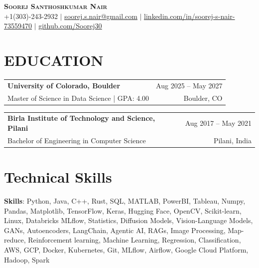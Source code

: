 \documentclass[letterpaper,11pt]{article}
\begin{document}
\begin{center}
    \textbf{\Huge \scshape Soorej Santhoshkumar Nair} \\ \vspace{2pt}
    \small +1(303)-243-2932 $|$ \href{mailto:soorej.s.nair@gmail.com}{\underline{soorej.s.nair@gmail.com}} $|$ \href{https://linkedin.com/in/soorej-s-nair-73559470}{\underline{linkedin.com/in/soorej-s-nair-73559470}} $|$ \href{https://github.com/Soorej30}{\underline{github.com/Soorej30}}
\end{center}

\vspace{-19pt}

\section*{EDUCATION}

\newcommand{\eduentry}[4]{%
  \noindent
  \begin{tabularx}{\linewidth}{@{}X r@{}}
    \textbf{#1} & #2 \\
    #3 & #4 \\
  \end{tabularx}
  \vspace{-2pt}
}

\eduentry
{University of Colorado, Boulder}
{Aug 2025 -- May 2027}
{Master of Science in Data Science \;|\; GPA: 4.00}
{Boulder, CO}

\eduentry
{Birla Institute of Technology and Science, Pilani}
{Aug 2017 -- May 2021}
{Bachelor of Engineering in Computer Science}
{Pilani, India}

\vspace{-12pt}

\section{Technical Skills}
\begin{itemize}
\small{\item{
\textbf{Skills}{: Python, Java, C++, Rust, SQL, MATLAB, PowerBI, Tableau, Numpy, Pandas, Matplotlib, TensorFlow, Keras, Hugging Face, OpenCV, Scikit-learn, Linux, Databricks MLflow, Statistics, Diffusion Models, Vision-Language Models, GANs, Autoencoders, LangChain, Agentic AI, RAGs, Image Processing, Map-reduce, Reinforcement learning, Machine Learning, Regression, Classification, AWS, GCP, Docker, Kubernetes, Git, MLflow, Airflow, Google Cloud Platform, Hadoop, Spark}
}}
\end{itemize}
\vspace{-12pt}
\end{document}
